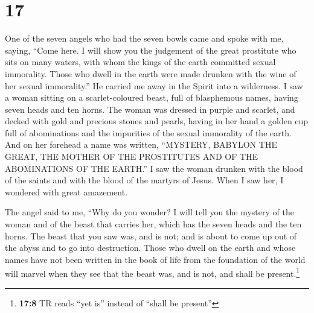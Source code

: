\hypertarget{section-16}{%
\section{17}\label{section-16}}

 One of the seven angels who had the seven bowls came and
spoke with me, saying, ``Come here. I will show you the judgement of the
great prostitute who sits on many waters,  with whom the
kings of the earth committed sexual immorality. Those who dwell in the
earth were made drunken with the wine of her sexual immorality.''
 He carried me away in the Spirit into a wilderness. I saw
a woman sitting on a scarlet-coloured beast, full of blasphemous names,
having seven heads and ten horns.  The woman was dressed
in purple and scarlet, and decked with gold and precious stones and
pearls, having in her hand a golden cup full of abominations and the
impurities of the sexual immorality of the earth.  And on
her forehead a name was written, ``MYSTERY, BABYLON THE GREAT, THE
MOTHER OF THE PROSTITUTES AND OF THE ABOMINATIONS OF THE EARTH.''
 I saw the woman drunken with the blood of the saints and
with the blood of the martyrs of Jesus. When I saw her, I wondered with
great amazement.

 The angel said to me, ``Why do you wonder? I will tell
you the mystery of the woman and of the beast that carries her, which
has the seven heads and the ten horns.  The beast that you
saw was, and is not; and is about to come up out of the abyss and to go
into destruction. Those who dwell on the earth and whose names have not
been written in the book of life from the foundation of the world will
marvel when they see that the beast was, and is not, and shall be
present.\footnote{\textbf{17:8} TR reads ``yet is'' instead of ``shall
  be present''}

